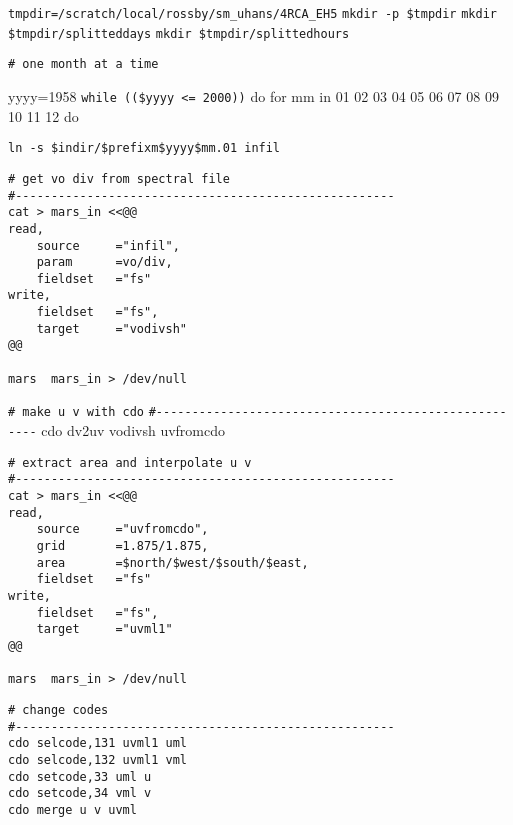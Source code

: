 \documentclass{article}
\begin{document}
\verb+tmpdir=/scratch/local/rossby/sm_uhans/4RCA_EH5+
\newline
\verb+mkdir -p $tmpdir+
\newline
\verb+mkdir $tmpdir/splitteddays+
\newline
\verb+mkdir $tmpdir/splittedhours+

\verb+# one month at a time+

yyyy=1958
\newline
\verb+while (($yyyy <= 2000))+
\newline
do
\newline
for mm in 01 02 03 04 05 06 07 08 09 10 11 12
\newline
do

\verb+ln -s $indir/$prefixm$yyyy$mm.01 infil+

\begin{verbatim}
# get vo div from spectral file
#-----------------------------------------------------
cat > mars_in <<@@
read,
    source     ="infil",
    param      =vo/div,
    fieldset   ="fs"
write,
    fieldset   ="fs",
    target     ="vodivsh"
@@

mars  mars_in > /dev/null
\end{verbatim}

\verb+# make u v with cdo+
\newline
\verb+#-----------------------------------------------------+
\newline
cdo dv2uv vodivsh uvfromcdo

\begin{verbatim}
# extract area and interpolate u v 
#-----------------------------------------------------
cat > mars_in <<@@
read,
    source     ="uvfromcdo",
    grid       =1.875/1.875,
    area       =$north/$west/$south/$east,
    fieldset   ="fs"
write,
    fieldset   ="fs",
    target     ="uvml1"
@@

mars  mars_in > /dev/null
\end{verbatim}

\begin{verbatim}
# change codes
#-----------------------------------------------------
cdo selcode,131 uvml1 uml
cdo selcode,132 uvml1 vml
cdo setcode,33 uml u
cdo setcode,34 vml v
cdo merge u v uvml
\end{verbatim}
\end{document}
